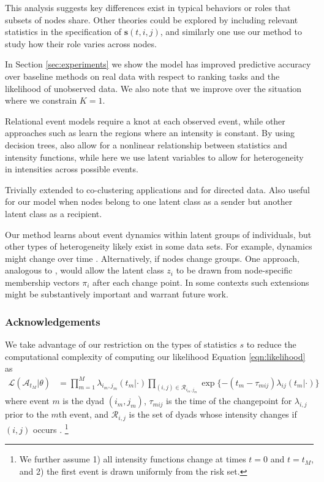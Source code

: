 \documentclass{article}
\begin{document}
This analysis suggests key differences exist in typical behaviors or roles that subsets of nodes share.  Other theories could be explored by including relevant statistics in the specification of $\mathbf{s}(t,i,j)$, and similarly one use our method to study how their role varies across nodes.

In Section \ref{sec:experiments} we show the model has improved predictive accuracy over baseline methods on real data with respect to ranking tasks and the likelihood of unobserved data.  We also note that we improve over the situation where we constrain $K=1$.

Relational event models \cite{Butts2008} require a knot at each observed event, while other approaches such as \cite{Gunawardana2011} learn the regions where an intensity is constant.  By using decision trees,  \cite{Gunawardana2011} also allow for a nonlinear relationship between statistics and intensity functions, while here we use latent variables to allow for heterogeneity in intensities across possible events.

Trivially extended to co-clustering applications and for directed data.  Also useful for our model when nodes belong to one latent class as a sender but another latent class as a recipient.

Our method learns about event dynamics within latent groups of individuals, but other types of heterogeneity likely exist in some data sets.  For example, dynamics might change over time \cite{Vu2011}.  Alternatively, if nodes change groups.  One approach, analogous to \cite{Airoldi2008}, would allow the latent class $z_i$ to be drawn from node-specific membership vectors $\pi_i$  after each change point.  In some contexts such extensions might be substantively important and warrant future work.

\subsubsection*{Acknowledgements}





We take advantage of our restriction on the types of statistics $s$ to reduce the computational complexity of computing our likelihood
 Equation \ref{eqn:likelihood} as 
\begin{align*}
\mathcal{L}(\mathcal{A}_{t_M}|\theta) &= \prod_{m=1}^M \lambda_{i_m,j_m}(t_m|\cdot) \prod_{(i,j) \in \mathcal{R}_{i_m,j_m}}\exp\{ - (t_m - \tau_{mij}) \lambda_{ij}(t_m | \cdot) \}
\end{align*}
\noindent where event $m$ is the dyad $(i_m,j_m)$, $\tau_{mij}$ is the time  of the changepoint for $\lambda_{i,j}$ prior to the $m$th event, and $\mathcal{R}_{i,j}$ is the set of dyads whose intensity changes if $(i,j)$ occurs  \cite{Butts2008}. \footnote{We further assume 1) all intensity functions change at times $t=0$ and $t=t_M$, and 2) the first event is drawn uniformly from the risk set.}
\end{document}
